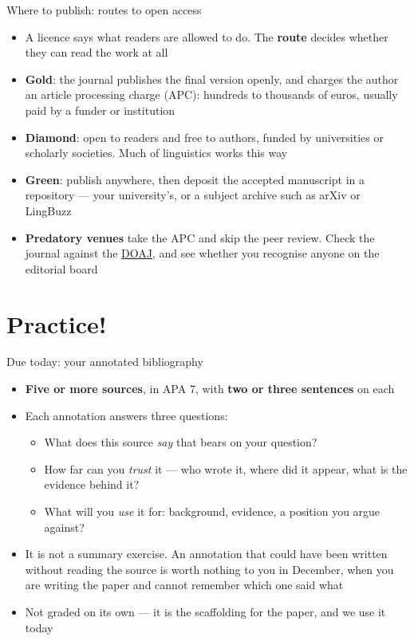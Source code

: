 \documentclass[aspectratio=169]{beamer}
\begin{document}
\begin{frame}{Where to publish: routes to open access}
\begin{itemize}
  \item A licence says what readers are allowed to do.  The \textbf{route}
    decides whether they can read the work at all
  \item \textbf{Gold}: the journal publishes the final version openly, and
    charges the author an article processing charge (APC): hundreds to
    thousands of euros, usually paid by a funder or institution
  \item \textbf{Diamond}: open to readers and free to authors, funded by
    universities or scholarly societies.  Much of linguistics works this way
  \item \textbf{Green}: publish anywhere, then deposit the accepted
    manuscript in a repository --- your university's, or a subject archive
    such as arXiv or LingBuzz
  \item \textbf{Predatory venues} take the APC and skip the peer review.
    Check the journal against the \href{https://doaj.org/}{DOAJ}, and see whether you recognise anyone
    on the editorial board
\end{itemize}
\end{frame}


\section{Practice!}

\begin{frame}{Due today: your annotated bibliography}
\begin{itemize}
  \item \textbf{Five or more sources}, in APA 7, with \textbf{two or three
    sentences} on each
  \item Each annotation answers three questions:
    \begin{itemize}
      \item What does this source \emph{say} that bears on your question?
      \item How far can you \emph{trust} it --- who wrote it, where did it
        appear, what is the evidence behind it?
      \item What will you \emph{use} it for: background, evidence, a position
        you argue against?
    \end{itemize}
  \item It is not a summary exercise.  An annotation that could have been
    written without reading the source is worth nothing to you in December,
    when you are writing the paper and cannot remember which one said what
  \item Not graded on its own --- it is the scaffolding for the paper, and we
    use it today
\end{itemize}
\end{frame}
\end{document}

